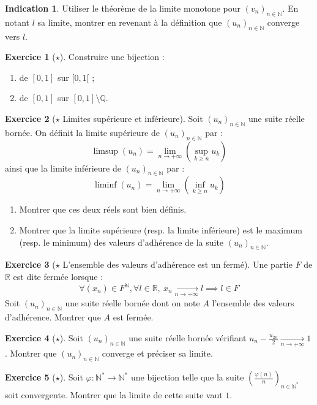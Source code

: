 \documentclass[french]{book}
\newcommand{\N}{\mathbb{N}}
\newcommand{\Q}{\mathbb{Q}}
\newcommand{\R}{\mathbb{R}}
\newcommand{\st}{^*}
\theoremstyle{definition}
\newtheorem{ex}{Exercice}[chapter]
\theoremstyle{theorem}
\newtheorem*{ind}{Indication}
\theoremstyle{remark}
\begin{document}
\begin{ind}
	Utiliser le théorème de la limite monotone pour $(v_n)_{n\in\N}$. En notant $l$ sa limite, montrer en revenant à la définition que $(u_n)_{n\in\N}$ converge vers $l$.
\end{ind}

\begin{ex}[$\star$]
	Construire une bijection : 
	\begin{enumerate}
		\item de $[0,1]$ sur $[0,1[$ ;
		\item de $[0,1]$ sur $[0,1]\setminus\Q$.
	\end{enumerate}
\end{ex}

\begin{ex}[$\star$ Limites supérieure et inférieure]
	Soit $(u_n)_{n\in\N}$ une suite réelle bornée. On définit la limite supérieure de $(u_n)_{n\in\N}$ par : $$\limsup(u_n)=\lim_{{n\to+\infty}}\left(\underset{k\geqslant n}{\sup}u_k\right)$$ ainsi que la limite inférieure de $(u_n)_{n\in\N}$ par : $$\liminf(u_n)=\lim_{{n\to+\infty}}\left(\underset{k\geqslant n}{\inf}u_k\right)$$
	\begin{enumerate}
		\item Montrer que ces deux réels sont bien définis.
		\item Montrer que la limite supérieure (resp. la limite inférieure) est le maximum (resp. le minimum) des valeurs d'adhérence de la suite $(u_n)_{n\in\N}$.
	\end{enumerate}
\end{ex}
	
\begin{ex}[$\star$ L'ensemble des valeurs d'adhérence est un fermé]
	Une partie $F$ de $\R$ est dite fermée lorsque : $$\forall (x_n)\in F^\N,\forall l\in\R,\ x_n\xrightarrow[n\to+\infty]{}l\implies l\in F$$ Soit $(u_n)_{n\in\N}$ une suite réelle bornée dont on note $A$ l'ensemble des valeurs d'adhérence. Montrer que $A$ est fermée.
\end{ex}

\begin{ex}[$\star$]
	Soit $(u_n)_{n\in\N}$ une suite réelle bornée vérifiant $u_n-\displaystyle\frac{u_{2n}}{2}\xrightarrow[n\to+\infty]{}1$. Montrer que $(u_n)_{n\in\N}$ converge et préciser sa limite.
\end{ex}

\begin{ex}[$\star$]
	Soit $\varphi:\N\st\to\N\st$ une bijection telle que la suite $\displaystyle\left(\frac{\varphi(n)}{n}\right)_{n\in\N\st}$ soit convergente. Montrer que la limite de cette suite vaut $1$.
\end{ex}
\end{document}
